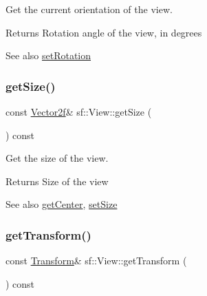 Get the current orientation of the view. 

\begin{DoxyReturn}{Returns}
Rotation angle of the view, in degrees
\end{DoxyReturn}
\begin{DoxySeeAlso}{See also}
\mbox{\hyperlink{classsf_1_1_view_a24d0503c9c51f5ef5918612786d325c1}{set\+Rotation}} \begin{DoxyVerb}\end{DoxyVerb}
 
\end{DoxySeeAlso}
\mbox{\label{classsf_1_1_view_a5432748dd3a78ac4019dfbde208c7cc1}} 
\subsubsection{\texorpdfstring{getSize()}{getSize()}}
{\footnotesize\ttfamily const \mbox{\hyperlink{classsf_1_1_vector2}{Vector2f}}\& sf\+::\+View\+::get\+Size (\begin{DoxyParamCaption}{ }\end{DoxyParamCaption}) const}



Get the size of the view. 

\begin{DoxyReturn}{Returns}
Size of the view
\end{DoxyReturn}
\begin{DoxySeeAlso}{See also}
\mbox{\hyperlink{classsf_1_1_view_a7f4443c194c691ae4dcf8fd9dd0eaa46}{get\+Center}}, \mbox{\hyperlink{classsf_1_1_view_a9525b73fe9fbaceb9568faf56b399dab}{set\+Size}} \begin{DoxyVerb}\end{DoxyVerb}
 
\end{DoxySeeAlso}
\mbox{\label{classsf_1_1_view_a13da786526688bf99dc2cd3e658a3c2a}} 
\subsubsection{\texorpdfstring{getTransform()}{getTransform()}}
{\footnotesize\ttfamily const \mbox{\hyperlink{classsf_1_1_transform}{Transform}}\& sf\+::\+View\+::get\+Transform (\begin{DoxyParamCaption}{ }\end{DoxyParamCaption}) const}



